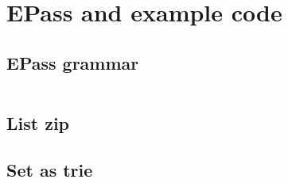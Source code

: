 \documentclass[12pt, openany]{memoir}
\begin{document}
\appendix
\chapter{EPass and example code} 
\section{EPass grammar} \label{sec:grammar}
\inputminted{text}{code/grammar.txt}
\newpage
\section{List zip} \label{sec:exnzip}

\newpage
\section{Set as trie} \label{sec:trie}

\backmatter
\printbibliography
\end{document}

